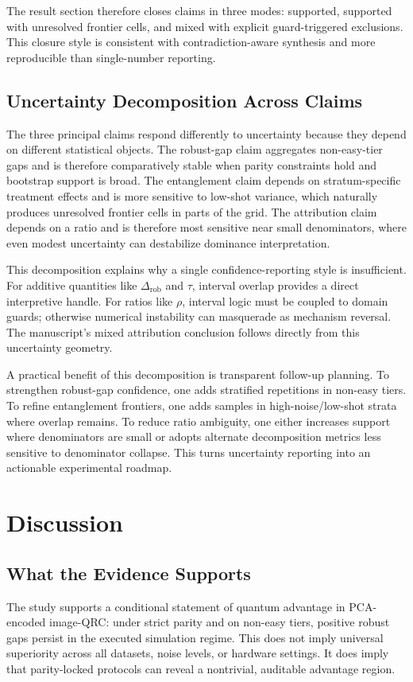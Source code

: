 \documentclass{article} %
\begin{document}
The result section therefore closes claims in three modes: supported, supported with unresolved frontier cells, and mixed with explicit guard-triggered exclusions. This closure style is consistent with contradiction-aware synthesis and more reproducible than single-number reporting.


\subsection{Uncertainty Decomposition Across Claims}
The three principal claims respond differently to uncertainty because they depend on different statistical objects. The robust-gap claim aggregates non-easy-tier gaps and is therefore comparatively stable when parity constraints hold and bootstrap support is broad. The entanglement claim depends on stratum-specific treatment effects and is more sensitive to low-shot variance, which naturally produces unresolved frontier cells in parts of the grid. The attribution claim depends on a ratio and is therefore most sensitive near small denominators, where even modest uncertainty can destabilize dominance interpretation.

This decomposition explains why a single confidence-reporting style is insufficient. For additive quantities like $\Delta_{\mathrm{rob}}$ and $\tau$, interval overlap provides a direct interpretive handle. For ratios like $\rho$, interval logic must be coupled to domain guards; otherwise numerical instability can masquerade as mechanism reversal. The manuscript's mixed attribution conclusion follows directly from this uncertainty geometry.

A practical benefit of this decomposition is transparent follow-up planning. To strengthen robust-gap confidence, one adds stratified repetitions in non-easy tiers. To refine entanglement frontiers, one adds samples in high-noise/low-shot strata where overlap remains. To reduce ratio ambiguity, one either increases support where denominators are small or adopts alternate decomposition metrics less sensitive to denominator collapse. This turns uncertainty reporting into an actionable experimental roadmap.

\section{Discussion}
\label{sec:discussion}
\subsection{What the Evidence Supports}
The study supports a conditional statement of quantum advantage in PCA-encoded image-QRC: under strict parity and on non-easy tiers, positive robust gaps persist in the executed simulation regime. This does not imply universal superiority across all datasets, noise levels, or hardware settings. It does imply that parity-locked protocols can reveal a nontrivial, auditable advantage region.
\end{document}
